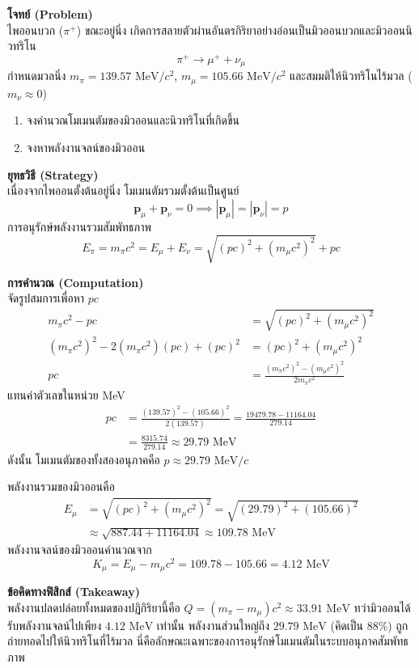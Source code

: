 \begin{psctexample}
\textbf{โจทย์ (Problem)} \\
ไพออนบวก ($\pi^+$) ขณะอยู่นิ่ง เกิดการสลายตัวผ่านอันตรกิริยาอย่างอ่อนเป็นมิวออนบวกและมิวออนนิวทริโน
\begin{equation}
\pi^+ \to \mu^+ + \nu_\mu
\end{equation}
กำหนด\mbox{มวลนิ่ง} $m_\pi = 139.57\text{ MeV}/c^2$, $m_\mu = 105.66\text{ MeV}/c^2$ และสมมติให้นิวทริโนไร้มวล ($m_\nu \approx 0$)
\begin{enumerate}
    \item จงคำนวณโมเมนตัมของมิวออนและนิวทริโนที่เกิดขึ้น
    \item จงหาพลังงานจลน์ของมิวออน
\end{enumerate}

\textbf{ยุทธวิธี (Strategy)} \\
เนื่องจากไพออนตั้งต้นอยู่นิ่ง โมเมนตัมรวมตั้งต้นเป็นศูนย์
\begin{equation}
\mathbf{p}_\mu + \mathbf{p}_\nu = 0 \implies |\mathbf{p}_\mu| = |\mathbf{p}_\nu| = p
\end{equation}
การอนุรักษ์พลังงานรวมสัมพัทธภาพ
\begin{equation}
E_\pi = m_\pi c^2 = E_\mu + E_\nu = \sqrt{(pc)^2 + (m_\mu c^2)^2} + pc
\end{equation}

\textbf{การคำนวณ (Computation)} \\
จัดรูปสมการเพื่อหา $pc$
\begin{align}
m_\pi c^2 - pc &= \sqrt{(pc)^2 + (m_\mu c^2)^2} \\
(m_\pi c^2)^2 - 2 (m_\pi c^2)(pc) + (pc)^2 &= (pc)^2 + (m_\mu c^2)^2 \\
pc &= \frac{(m_\pi c^2)^2 - (m_\mu c^2)^2}{2 m_\pi c^2}
\end{align}
แทนค่าตัวเลขในหน่วย MeV
\begin{align}
pc &= \frac{(139.57)^2 - (105.66)^2}{2 (139.57)} = \frac{19479.78 - 11164.04}{279.14} \nonumber \\
&= \frac{8315.74}{279.14} \approx 29.79\text{ MeV}
\end{align}
ดังนั้น โมเมนตัมของทั้งสองอนุภาคคือ $p \approx 29.79\text{ MeV}/c$

พลังงานรวมของมิวออนคือ
\begin{align}
E_\mu &= \sqrt{(pc)^2 + (m_\mu c^2)^2} = \sqrt{(29.79)^2 + (105.66)^2} \nonumber \\
&\approx \sqrt{887.44 + 11164.04} \approx 109.78\text{ MeV}
\end{align}
พลังงานจลน์ของมิวออนคำนวณจาก
\begin{equation}
K_\mu = E_\mu - m_\mu c^2 = 109.78 - 105.66 = 4.12\text{ MeV}
\end{equation}

\textbf{ข้อคิดทางฟิสิกส์ (Takeaway)} \\
พลังงานปลดปล่อยทั้งหมดของปฏิกิริยานี้คือ $Q = (m_\pi - m_\mu)c^2 \approx 33.91\text{ MeV}$ ทว่ามิวออนได้รับพลังงานจลน์ไปเพียง $4.12\text{ MeV}$ เท่านั้น พลังงานส่วนใหญ่ถึง $29.79\text{ MeV}$ (คิดเป็น 88\%) ถูกถ่ายทอดไปให้นิวทริโนที่ไร้มวล นี่คือลักษณะเฉพาะของการอนุรักษ์โมเมนตัมในระบบอนุภาคสัมพัทธภาพ
\qedexam
\end{psctexample}

